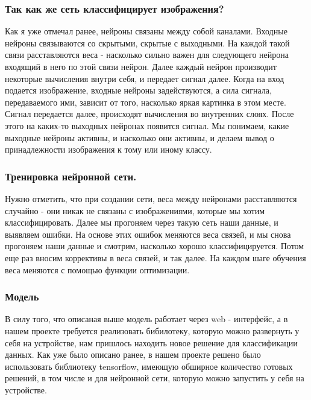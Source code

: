 \subsubsection{Так как же сеть классифицирует изображения?}
Как я уже отмечал ранее, нейроны связаны между собой каналами. 
Входные нейроны связываются со скрытыми, скрытые с выходными. На каждой такой связи расставляются веса - насколько сильно важен для следующего нейрона входящий в него по этой связи нейрон. Далее каждый нейрон производит некоторые вычисления внутри себя, и передает сигнал далее.
Когда на вход подается изображение, входные нейроны задействуются, а сила сигнала, передаваемого ими, зависит от того, насколько яркая картинка в этом месте. Сигнал передается далее, происходят вычисления во внутренних слоях. После этого на каких-то выходных нейронах появится сигнал. Мы понимаем, какие выходные нейроны активны, и насколько они активны, и делаем вывод о принадлежности изображения к тому или иному классу.
\subsubsection{Тренировка нейронной сети.}
Нужно отметить, что при создании сети, веса между нейронами расставляются случайно - они никак не связаны с изображениями, которые мы хотим классифицировать. Далее мы прогоняем через такую сеть наши данные, и выявляем ошибки. На основе этих ошибок меняются веса связей, и мы снова прогоняем наши данные и смотрим, насколько хорошо классифицируется. Потом еще раз вносим коррективы в веса связей, и так далее. На каждом шаге обучения веса меняются с помощью функции оптимизации.




\subsubsection{Модель}

В силу того, что описаная выше модель работает через web - интерфейс, а в нашем проекте требуется реализовать бибилотеку, которую можно развернуть у себя на устройстве, нам пришлось находить новое решение для классификации данных.
Как уже было описано ранее, в нашем проекте решено было использовать библиотеку tensorflow, имеющую обширное количество готовых решений, в том числе и для нейронной сети, которую можно запустить у себя на устройстве.

